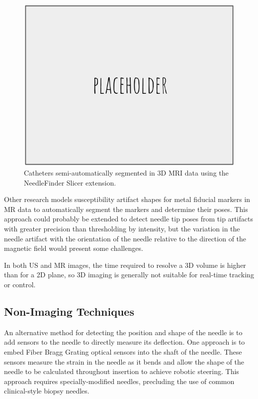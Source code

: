 \begin{figure}[h]
\includegraphics[width=1.0\textwidth]{Fig/placeholder.png}
\caption{Catheters semi-automatically segmented in 3D MRI data using the NeedleFinder Slicer extension\cite{pernelle_validation_2013}.}
\label{fig:needlefinder}
\end{figure}

Other research models susceptibility artifact shapes for metal fiducial markers in MR data to automatically segment the markers and determine their poses\cite{zijlstra_fast_2017}. This approach could probably be extended to detect needle tip poses from tip artifacts with greater precision than thresholding by intensity, but the variation in the needle artifact with the orientation of the needle relative to the direction of the magnetic field would present some challenges.

In both US and MR images, the time required to resolve a 3D volume is higher than for a 2D plane, so 3D imaging is generally not suitable for real-time tracking or control.

\subsection{Non-Imaging Techniques}
An alternative method for detecting the position and shape of the needle is to add sensors to the needle to directly measure its deflection. One approach is to embed Fiber Bragg Grating optical sensors into the shaft of the needle\cite{roesthuis_three-dimensional_2014}. These sensors measure the strain in the needle as it bends and allow the shape of the needle to be calculated throughout insertion to achieve robotic steering. This approach requires specially-modified needles, precluding the use of common clinical-style biopsy needles.

